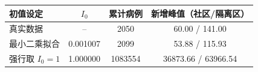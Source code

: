 \begin{tabular}{lccc}
\toprule
初值设定 & $I_0$ & 累计病例 & 新增峰值（社区/隔离区） \\
\midrule
真实数据 & -- & 2050 & 60.00 / 141.00 \\
最小二乘拟合 & 0.001007 & 2099 & 53.88 / 115.93 \\
强行取 $I_0=1$ & 1.000000 & 1083554 & 36873.66 / 63966.54 \\
\bottomrule
\end{tabular}
